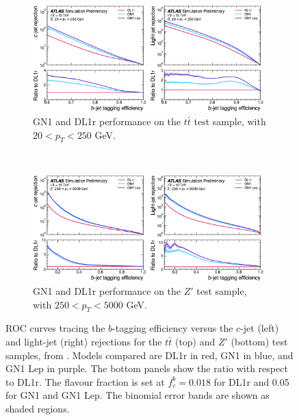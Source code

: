\begin{figure}[h!]
  \centering
  \begin{subfigure}[b]{0.98\textwidth}
      \centering
      \includegraphics[width=0.98\textwidth]{Images/FTAG/GN/GN1/ROC/ttb.png}
      \caption{GN1 and DL1r performance on the $t\bar{t}$ test sample, with $20 < p_T < 250$ GeV.} 
      \label{fig:GN1ttb}
  \end{subfigure}\\
  \begin{subfigure}[b]{0.98\textwidth}
    \centering %
      \includegraphics[width=0.98\textwidth]{Images/FTAG/GN/GN1/ROC/zpb.png}
      \caption{GN1 and DL1r performance on the $Z'$ test sample, with $250 < p_T < 5000$ GeV.} 
      \label{fig:GN1zpb}
  \end{subfigure}
  \caption{ROC curves tracing the $b$-tagging efficiency versus the $c$-jet (left) and light-jet (right) rejections for the $t\bar{t}$ (top) and $Z'$ (bottom) test samples, from \cite{ATL-PHYS-PUB-2022-027}. Models compared are DL1r in red, GN1 in blue, and GN1 Lep in purple. The bottom panels show the ratio with respect to DL1r. The flavour fraction is set at $f^b_c = 0.018$ for DL1r and 0.05 for GN1 and GN1 Lep. The binomial error bands are shown as shaded regions.}
  \label{fig:GN1rocb}
\end{figure} 


